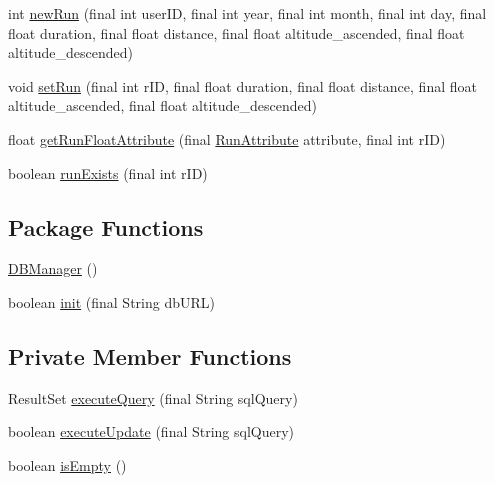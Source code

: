 \begin{DoxyCompactItemize}
\item 
int \mbox{\hyperlink{classcom_1_1activitytracker_1_1_d_b_manager_a05b742f583167f6ce00eb8415c43fc1c}{new\+Run}} (final int user\+ID, final int year, final int month, final int day, final float duration, final float distance, final float altitude\+\_\+ascended, final float altitude\+\_\+descended)
\item 
void \mbox{\hyperlink{classcom_1_1activitytracker_1_1_d_b_manager_a72282377a552ce4ce371abff02e312f2}{set\+Run}} (final int r\+ID, final float duration, final float distance, final float altitude\+\_\+ascended, final float altitude\+\_\+descended)
\item 
float \mbox{\hyperlink{classcom_1_1activitytracker_1_1_d_b_manager_a666452f1e5862f90c06b0beb9a9fcfdd}{get\+Run\+Float\+Attribute}} (final \mbox{\hyperlink{enumcom_1_1activitytracker_1_1_run_attribute}{Run\+Attribute}} attribute, final int r\+ID)
\item 
boolean \mbox{\hyperlink{classcom_1_1activitytracker_1_1_d_b_manager_a723ac1c573bacdd0b62894357bd65a9b}{run\+Exists}} (final int r\+ID)
\end{DoxyCompactItemize}
\subsection*{Package Functions}
\begin{DoxyCompactItemize}
\item 
\mbox{\hyperlink{classcom_1_1activitytracker_1_1_d_b_manager_ac1f558ef56fe02d74fe103a473a15bb5}{D\+B\+Manager}} ()
\item 
boolean \mbox{\hyperlink{classcom_1_1activitytracker_1_1_d_b_manager_a41df4600bb5901a26a4ea6a7108a70b9}{init}} (final String db\+U\+RL)
\end{DoxyCompactItemize}
\subsection*{Private Member Functions}
\begin{DoxyCompactItemize}
\item 
Result\+Set \mbox{\hyperlink{classcom_1_1activitytracker_1_1_d_b_manager_adef71a18dc05536d80e83311841e1953}{execute\+Query}} (final String sql\+Query)
\item 
boolean \mbox{\hyperlink{classcom_1_1activitytracker_1_1_d_b_manager_a382397e2bdf309901d1c80ff66be69b7}{execute\+Update}} (final String sql\+Query)
\item 
boolean \mbox{\hyperlink{classcom_1_1activitytracker_1_1_d_b_manager_af9ab112f840e3c803b6b28a2f1a15215}{is\+Empty}} ()
\end{DoxyCompactItemize}
